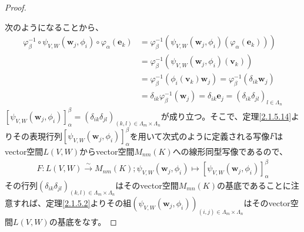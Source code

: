 \documentclass[dvipdfmx]{jsarticle}
\begin{document}
\begin{proof}
\begin{center}
\end{center}
次のようになることから、
\begin{align*}
\varphi_{\beta}^{- 1} \circ \psi_{V,W}\left( \mathbf{w}_{j},\phi_{i} \right) \circ \varphi_{\alpha}\left( \mathbf{e}_{k} \right) &= \varphi_{\beta}^{- 1}\left( \psi_{V,W}\left( \mathbf{w}_{j},\phi_{i} \right)\left( \varphi_{\alpha}\left( \mathbf{e}_{k} \right) \right) \right)\\
&= \varphi_{\beta}^{- 1}\left( \psi_{V,W}\left( \mathbf{w}_{j},\phi_{i} \right)\left( \mathbf{v}_{k} \right) \right)\\
&= \varphi_{\beta}^{- 1}\left( \phi_{i}\left( \mathbf{v}_{k} \right)\mathbf{w}_{j} \right) = \varphi_{\beta}^{- 1}\left( \delta_{ik}\mathbf{w}_{j} \right)\\
&= \delta_{ik}\varphi_{\beta}^{- 1}\left( \mathbf{w}_{j} \right) = \delta_{ik}\mathbf{e}_{j} = \left( \delta_{ik}\delta_{jl} \right)_{l \in \varLambda_{n}}
\end{align*}
$\left[ \psi_{V,W}\left( \mathbf{w}_{j},\phi_{i} \right) \right]^{\beta}_{\alpha} = \left( \delta_{ik}\delta_{jl} \right)_{(k,l) \in \varLambda_{m} \times \varLambda_{n}}$が成り立つ。そこで、定理\ref{2.1.5.14}よりその表現行列$\left[ \psi_{V,W}\left( \mathbf{w}_{j},\phi_{i} \right) \right]^{\beta}_{\alpha}$を用いて次式のように定義される写像$F$はvector空間$L(V,W)$からvector空間$M_{nm}(K)$への線形同型写像であるので、
\begin{align*}
F:L(V,W)\overset{\sim}{\rightarrow}M_{nm}(K);\psi_{V,W}\left( \mathbf{w}_{j},\phi_{i} \right) \mapsto \left[ \psi_{V,W}\left( \mathbf{w}_{j},\phi_{i} \right) \right]_{\alpha}^{\beta}
\end{align*}
その行列$\left( \delta_{ik}\delta_{jl} \right)_{(k,l) \in \varLambda_{m} \times \varLambda_{n}}$はそのvector空間$M_{mn}(K)$の基底であることに注意すれば、定理\ref{2.1.5.2}よりその組$\left( \psi_{V,W}\left( \mathbf{w}_{j},\phi_{i} \right)\right)_{(i,j) \in \varLambda_{m} \times \varLambda_{n}}$はそのvector空間$L(V,W)$の基底をなす。\par

\end{proof}
\end{document}
